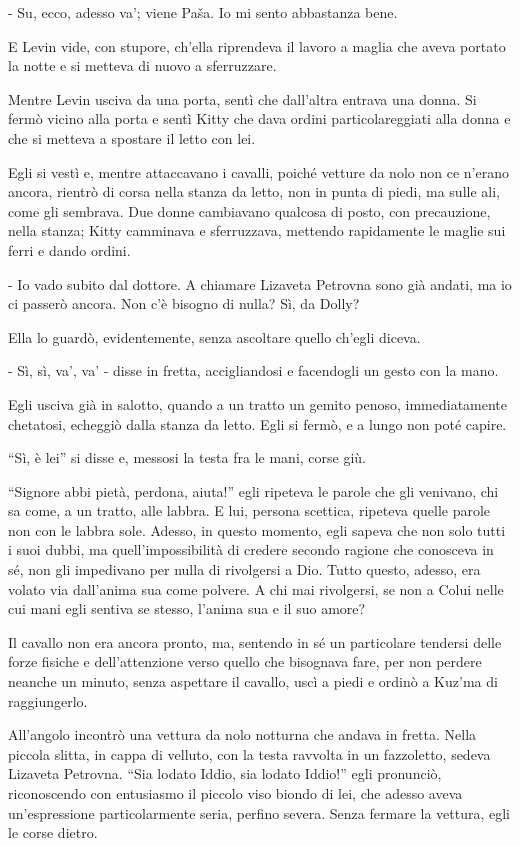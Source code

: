 - Su, ecco, adesso va'; viene Paša. Io mi sento abbastanza bene. 

E Levin vide, con stupore, ch'ella riprendeva il lavoro a maglia che aveva portato la notte e si metteva di nuovo a sferruzzare. 

Mentre Levin usciva da una porta, sentì che dall'altra entrava una donna. Si fermò vicino alla porta e sentì Kitty che dava ordini particolareggiati alla donna e che si metteva a spostare il letto con lei. 

Egli si vestì e, mentre attaccavano i cavalli, poiché vetture da nolo non ce n'erano ancora, rientrò di corsa nella stanza da letto, non in punta di piedi, ma sulle ali, come gli sembrava. Due donne cambiavano qualcosa di posto, con precauzione, nella stanza; Kitty camminava e sferruzzava, mettendo rapidamente le maglie sui ferri e dando ordini. 

- Io vado subito dal dottore. A chiamare Lizaveta Petrovna sono già andati, ma io ci passerò ancora. Non c'è bisogno di nulla? Sì, da Dolly? 

Ella lo guardò, evidentemente, senza ascoltare quello ch'egli diceva. 

- Sì, sì, va', va' - disse in fretta, accigliandosi e facendogli un gesto con la mano. 

Egli usciva già in salotto, quando a un tratto un gemito penoso, immediatamente chetatosi, echeggiò dalla stanza da letto. Egli si fermò, e a lungo non poté capire. 

``Sì, è lei'' si disse e, messosi la testa fra le mani, corse giù. 

``Signore abbi pietà, perdona, aiuta!'' egli ripeteva le parole che gli venivano, chi sa come, a un tratto, alle labbra. E lui, persona scettica, ripeteva quelle parole non con le labbra sole. Adesso, in questo momento, egli sapeva che non solo tutti i suoi dubbi, ma quell'impossibilità di credere secondo ragione che conosceva in sé, non gli impedivano per nulla di rivolgersi a Dio. Tutto questo, adesso, era volato via dall'anima sua come polvere. A chi mai rivolgersi, se non a Colui nelle cui mani egli sentiva se stesso, l'anima sua e il suo amore? 

Il cavallo non era ancora pronto, ma, sentendo in sé un particolare tendersi delle forze fisiche e dell'attenzione verso quello che bisognava fare, per non perdere neanche un minuto, senza aspettare il cavallo, uscì a piedi e ordinò a Kuz'ma di raggiungerlo. 

All'angolo incontrò una vettura da nolo notturna che andava in fretta. Nella piccola slitta, in cappa di velluto, con la testa ravvolta in un fazzoletto, sedeva Lizaveta Petrovna. ``Sia lodato Iddio, sia lodato Iddio!'' egli pronunciò, riconoscendo con entusiasmo il piccolo viso biondo di lei, che adesso aveva un'espressione particolarmente seria, perfino severa. Senza fermare la vettura, egli le corse dietro. 

